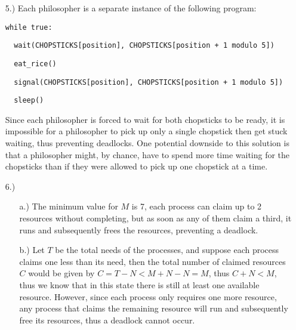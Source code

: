 \documentclass[12pt]{article}
\begin{document}
\begin{itemize}
        \pagebreak
        \item [5.)] Each philosopher is a separate instance of the following
            program:

            \verb|while true:|

            \verb|  wait(CHOPSTICKS[position], CHOPSTICKS[position + 1 modulo 5])|

            \verb|  eat_rice()|

            \verb|  signal(CHOPSTICKS[position], CHOPSTICKS[position + 1 modulo 5])|

            \verb|  sleep()|
            
            Since each philosopher is forced to wait for both chopsticks to
            be ready, it is impossible for a philosopher to pick up only a
            single chopstick then get stuck waiting, thus preventing deadlocks.
            One potential downside to this solution is that a philosopher
            might, by chance, have to spend more time waiting for the
            chopsticks than if they were allowed to pick up one chopstick
            at a time.

        \item [6.)] \begin{itemize}
            \item [a.)] The minimum value for \( M \) is 7, each process can
                claim up to 2 resources without completing, but as soon as
                any of them claim a third, it runs and subsequently frees
                the resources, preventing a deadlock.

            \item [b.)] Let \( T \) be the total needs of the processes, and
                suppose each process claims one less than its need, then the
                total number of claimed resources \( C \) would be given by
                \( C = T - N < M + N - N = M \), thus \( C + N < M \), thus
                we know that in this state there is still at least one
                available resource.
                However, since each process only requires one more resource,
                any process that claims the remaining resource will run and
                subsequently free its resources, thus a deadlock cannot occur.
        \end{itemize}
    \end{itemize}
\end{document}
